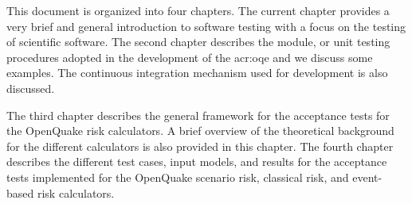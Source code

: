 This document is organized into four chapters. The current chapter provides a very brief and general introduction to software testing with a focus on the testing of scientific software. The second chapter describes the module, or unit testing procedures adopted in the development of the \gls{acr:oqe} and we discuss some examples. The continuous integration mechanism used for development is also discussed.

The third chapter describes the general framework for the acceptance tests for the OpenQuake risk calculators. A brief overview of the theoretical background for the different calculators is also provided in this chapter. The fourth chapter describes the different test cases, input models, and results for the acceptance tests implemented for the OpenQuake scenario risk, classical risk, and event-based risk calculators.




